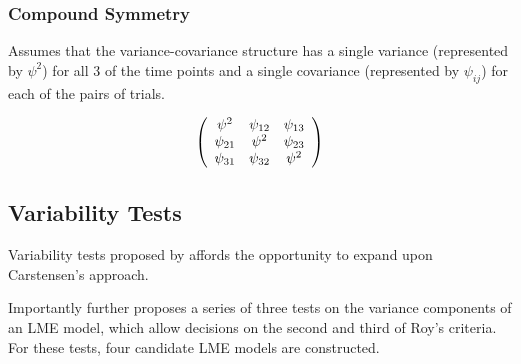 \documentclass[12pt, a4paper]{report}
\theoremstyle{plain}
\theoremstyle{definition}
\theoremstyle{remark}
\begin{document}
	\subsubsection{Compound Symmetry}
	
	Assumes that the variance-covariance structure has a single variance (represented by $\psi^2$)
	for all 3 of the time points and a single covariance (represented by $\psi_{ij}$) for each of the pairs of trials.
	
	\[
	\left(%
	\begin{array}{c c c}
	\psi^2 &  \psi_{12} & \psi_{13}   \\
	\psi_{21} & \psi^2 & \psi_{23}   \\
	\psi_{31} & \psi_{32} & \psi^2   \\
	\end{array}%
	\right)
	\]
	
	
	
	
	
	
	
	
	
	
	\subsection{Variability Tests}
	
	
	Variability tests proposed by \citet{ARoy2009} affords the opportunity to expand upon Carstensen's approach.
	
	
	Importantly \citet{ARoy2009} further proposes a series of three tests on the variance components of an LME model, which allow decisions on the second and third of Roy's criteria. For these tests, four candidate LME models are constructed. 
	
\end{document}

